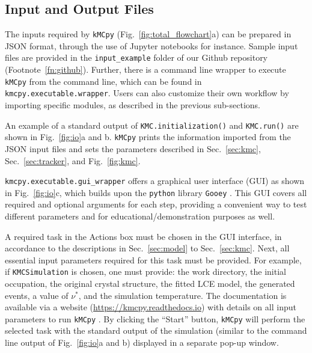 \documentclass[a4paper,fleqn]{cas-dc}
\begin{document}
{\subsection{Input and Output Files}\label{sec:io}
\noindent The inputs required by \texttt{kMCpy} (Fig.~\ref{fig:total_flowchart}a) can be prepared in JSON format, through the use of Jupyter notebooks for instance. Sample input files are provided in the \texttt{input\_example} folder of our Github repository (Footnote~\ref{fn:github}). Further, there is a command line wrapper to execute \texttt{kMCpy} from the command line, which can be found in \texttt{kmcpy.executable.wrapper}. Users can also customize their own workflow by importing specific modules, as described in the previous sub-sections.

An example of a standard output of \texttt{KMC.initialization()} and \texttt{KMC.run()} are shown in Fig.~\ref{fig:io}a and b. \texttt{kMCpy} prints the information imported from the JSON input files and sets the parameters described in Sec.~\ref{sec:kmc}, Sec.~\ref{sec:tracker}, and Fig.~\ref{fig:kmc}.

\texttt{kmcpy.executable.gui\_wrapper} offers a graphical user interface (GUI) as shown in Fig.~\ref{fig:io}c, which builds upon the \texttt{python} library \texttt{Gooey} \cite{kiel_gooey_2022}. This GUI covers all required and optional arguments for each step, providing a convenient way to test different parameters and for educational/demonstration purposes as well. 

A required task in the Actions box must be chosen in the GUI interface, in accordance to the descriptions in Sec.~\ref{sec:model} to Sec.~\ref{sec:kmc}. Next, all essential input parameters required for this task must be provided. For example, if \texttt{KMCSimulation} is chosen, one must provide: the work directory, the initial occupation, the original crystal structure, the fitted LCE model, the generated events, a value of $\nu^*$, and the simulation temperature. The  documentation is available via a website (\url{https://kmcpy.readthedocs.io}) with details on all input parameters to run \texttt{kMCpy} \cite{noauthor_kmcpy_2022}. By clicking the ``Start'' button, \texttt{kMCpy} will perform the selected task with the standard output of the simulation (similar to the command line output of Fig.~\ref{fig:io}a and b) displayed in a separate pop-up window.

}
\end{document}
